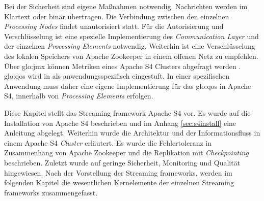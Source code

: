 Bei der Sicherheit sind eigene Maßnahmen notwendig. Nachrichten werden im Klartext oder binär übertragen. Die Verbindung zwischen den einzelnen \textit{Processing Nodes} findet unautorisiert statt. Für die Autorisierung und Verschlüsselung ist eine spezielle Implementierung des \textit{Communication Layer} und der einzelnen \textit{Processing Elements} notwendig. Weiterhin ist eine Verschlüsselung des lokalen Speichers von Apache Zookeeper in einem offenen Netz zu empfehlen. Über \gls{glo:jmx} können Metriken eines Apache S4 Clusters abgefragt werden . \gls{glo:qos} wird in  als anwendungsspezifisch eingestuft. In einer spezifischen Anwendung muss daher eine eigene Implementierung für das \gls{glo:qos} in Apache S4, innerhalb von \textit{Processing Elements} erfolgen.


Diese Kapitel stellt das Streaming framework Apache S4 vor. Es wurde auf die Installation von Apache S4 beschrieben und im Anhang \ref{sec:s4install} eine Anleitung abgelegt. Weiterhin wurde die Architektur und der Informationsfluss in einem Apache S4 \textit{Cluster} erläutert. Es wurde die Fehlertoleranz in Zusammenhang von Apache Zookeeper und die Replikation mit \textit{Checkpointing} beschrieben. Zuletzt wurde auf geringe Sicherheit, Monitoring und Qualität hingewiesen. Nach der Vorstellung der Streaming frameworks, werden im folgenden Kapitel die wesentlichen Kernelemente der einzelnen Streaming frameworks zusammengefasst.